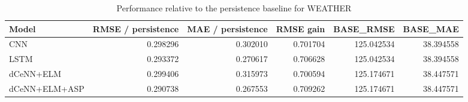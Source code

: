 \begin{table}
\caption{Performance relative to the persistence baseline for WEATHER}
\begin{tabular}{lrrrrr}
\toprule
Model & RMSE / persistence & MAE / persistence & RMSE gain & BASE\_RMSE & BASE\_MAE \\
\midrule
CNN & 0.298296 & 0.302010 & 0.701704 & 125.042534 & 38.394558 \\
LSTM & 0.293372 & 0.270617 & 0.706628 & 125.042534 & 38.394558 \\
dCeNN+ELM & 0.299406 & 0.315973 & 0.700594 & 125.174671 & 38.447571 \\
dCeNN+ELM+ASP & 0.290738 & 0.267553 & 0.709262 & 125.174671 & 38.447571 \\
\bottomrule
\end{tabular}
\end{table}
